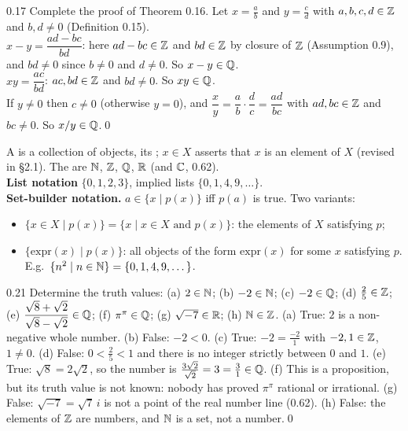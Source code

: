 \begin{bookex}{0.17}
Complete the proof of Theorem 0.16.
\solution
Let $x=\frac ab$ and $y=\frac cd$ with $a,b,c,d\in\mathbb{Z}$ and $b,d\ne0$ (Definition 0.15).\\
$x-y=\dfrac{ad-bc}{bd}$: here $ad-bc\in\mathbb{Z}$ and $bd\in\mathbb{Z}$ by closure of $\mathbb{Z}$ (Assumption 0.9), and $bd\ne0$ since $b\ne0$ and $d\ne0$. So $x-y\in\mathbb{Q}$.\\
$xy=\dfrac{ac}{bd}$: $ac,bd\in\mathbb{Z}$ and $bd\ne0$. So $xy\in\mathbb{Q}$.\\
If $y\ne0$ then $c\ne0$ (otherwise $y=0$), and $\dfrac xy=\dfrac ab\cdot\dfrac dc=\dfrac{ad}{bc}$ with $ad,bc\in\mathbb{Z}$ and $bc\ne0$. So $x/y\in\mathbb{Q}$.\qed
\end{bookex}


\begin{key}
A  is a collection of objects, its ; $x\in X$ asserts that $x$ is an element of $X$ (revised in \S2.1). The  are $\mathbb{N}$, $\mathbb{Z}$, $\mathbb{Q}$, $\mathbb{R}$ (and $\mathbb{C}$, 0.62).\\
\textbf{List notation} $\{0,1,2,3\}$, implied lists $\{0,1,4,9,\dots\}$.\\
\textbf{Set-builder notation.} $a\in\{x\mid p(x)\}$ iff $p(a)$ is true. Two variants:
\begin{itemize}
\item $\{x\in X\mid p(x)\}=\{x\mid x\in X\text{ and }p(x)\}$: the elements of $X$ satisfying $p$;
\item $\{\mathrm{expr}(x)\mid p(x)\}$: all objects of the form $\mathrm{expr}(x)$ for some $x$ satisfying $p$. E.g.\ $\{n^2\mid n\in\mathbb{N}\}=\{0,1,4,9,\dots\}$.
\end{itemize}
\end{key}

\begin{bookex}[essential]{0.21}
Determine the truth values: (a) $2\in\mathbb{N}$; (b) $-2\in\mathbb{N}$; (c) $-2\in\mathbb{Q}$; (d) $\frac25\in\mathbb{Z}$; (e) $\dfrac{\sqrt8+\sqrt2}{\sqrt8-\sqrt2}\in\mathbb{Q}$; (f) $\pi^\pi\in\mathbb{Q}$; (g) $\sqrt{-7}\in\mathbb{R}$; (h) $\mathbb{N}\in\mathbb{Z}$.
\solution
(a) True: $2$ is a non-negative whole number. (b) False: $-2<0$. (c) True: $-2=\frac{-2}{1}$ with $-2,1\in\mathbb{Z}$, $1\ne0$. (d) False: $0<\frac25<1$ and there is no integer strictly between $0$ and $1$. (e) True: $\sqrt8=2\sqrt2$, so the number is $\frac{3\sqrt2}{\sqrt2}=3=\frac31\in\mathbb{Q}$. (f) This is a proposition, but its truth value is not known: nobody has proved $\pi^\pi$ rational or irrational. (g) False: $\sqrt{-7}=\sqrt7\,i$ is not a point of the real number line (0.62). (h) False: the elements of $\mathbb{Z}$ are numbers, and $\mathbb{N}$ is a set, not a number.\qed
\end{bookex}

